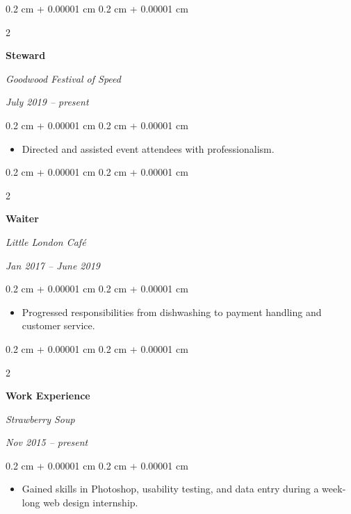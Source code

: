 \documentclass[10pt, letterpaper]{article}
\newenvironment{highlights}{
    \begin{itemize}[
        topsep=0.10 cm,
        parsep=0.10 cm,
        partopsep=0pt,
        itemsep=0pt,
        leftmargin=0.4 cm + 10pt
    ]
}{
    \end{itemize}
} %
\newenvironment{onecolentry}{
    \begin{adjustwidth}{
        0.2 cm + 0.00001 cm
    }{
        0.2 cm + 0.00001 cm
    }
}{
    \end{adjustwidth}
} %
\newenvironment{twocolentry}[2][]{
    \onecolentry
    \def\secondColumn{#2}
    \setcolumnwidth{\fill, 4.5 cm}
    \begin{paracol}{2}
}{
    \switchcolumn \raggedleft \secondColumn
    \end{paracol}
    \endonecolentry
} %
\begin{document}
        \vspace{0.2 cm}

        \begin{twocolentry}{
            
            
        \textit{July 2019 – present}}
            \textbf{Steward}
            
            \textit{Goodwood Festival of Speed}
        \end{twocolentry}

        \vspace{0.10 cm}
        \begin{onecolentry}
            \begin{highlights}
                \item Directed and assisted event attendees with professionalism.
            \end{highlights}
        \end{onecolentry}


        \vspace{0.2 cm}

        \begin{twocolentry}{
            
            
        \textit{Jan 2017 – June 2019}}
            \textbf{Waiter}
            
            \textit{Little London Café}
        \end{twocolentry}

        \vspace{0.10 cm}
        \begin{onecolentry}
            \begin{highlights}
                \item Progressed responsibilities from dishwashing to payment handling and customer service.
            \end{highlights}
        \end{onecolentry}


        \vspace{0.2 cm}

        \begin{twocolentry}{
            
            
        \textit{Nov 2015 – present}}
            \textbf{Work Experience}
            
            \textit{Strawberry Soup}
        \end{twocolentry}

        \vspace{0.10 cm}
        \begin{onecolentry}
            \begin{highlights}
                \item Gained skills in Photoshop, usability testing, and data entry during a week-long web design internship.
            \end{highlights}
        \end{onecolentry}



    
\end{document}
